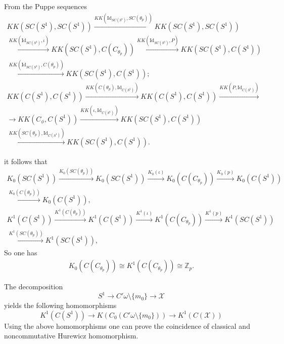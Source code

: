 \documentclass{beamer}
\theoremstyle{plain}
\newcommand{\Z}{\mathbb{Z}}                  %
\newcommand{\om}{\omega}                     %
\newcommand{\Id}{\mathrm{Id}}
\newcommand{\sX}{\mathcal{X}}       %
\renewcommand{\th}{\theta}
\newcommand{\bean}{\begin{eqnarray*}}
\newcommand{\eean}{\end{eqnarray*}}
\begin{document}
	\begin{frame}
		From the Puppe sequences 
		\small
\bean
KK\left(SC\left(S^1 \right), SC\left(S^1 \right)  \right)\xrightarrow{KK\left( \Id_{SC\left(S^1 \right)},SC\left(\th_p \right)  \right)} KK\left(SC\left(S^1 \right), SC\left(S^1 \right)  \right)\\\xrightarrow{KK\left( \Id_{SC\left(S^1 \right)},\iota  \right)} KK\left(SC\left(S^1 \right),C\left(C_{\th_p} \right) \right)\xrightarrow{KK\left( \Id_{SC\left(S^1 \right)},P \right)} KK\left(SC\left(S^1 \right), C\left(S^1 \right)  \right) \\ \xrightarrow{KK\left( \Id_{SC\left(S^1 \right)},C\left(\th_p \right)  \right)} KK\left(SC\left(S^1 \right), C\left(S^1 \right)  \right);\\
KK\left(C\left(S^1 \right),C\left(S^1 \right)   \right)\xrightarrow{KK\left(C\left(\th_p \right),\Id_{C\left(S^1 \right) }   \right)} KK\left(C\left(S^1 \right),C\left(S^1 \right)   \right) \xrightarrow{KK\left(P,\Id_{C\left(S^1 \right) }   \right)}\\\to KK\left(C_\phi,C\left(S^1 \right)   \right) \xrightarrow{KK\left(\iota,\Id_{C\left(S^1 \right) }   \right)} KK\left(SC\left(S^1 \right), C\left(S^1 \right) \right)\\\xrightarrow{KK\left(SC\left(\th_p \right),\Id_{C\left(S^1 \right) }   \right)}KK\left(SC\left(S^1 \right),C\left(S^1 \right)  \right).
\eean		\end{frame}
\begin{frame}
\normalsize it follows that	\small
\bean
K_0\left( SC\left(S^1 \right)  \right)\xrightarrow{K_0\left( SC\left(\th_p \right)  \right)} 	K_0\left( SC\left(S^1 \right) \right) \xrightarrow{K_0\left( \iota \right) }  K_0\left(C\left(C_{\th_p} \right) \right)\xrightarrow{K_0\left( p \right)}  	K_0\left( C\left(S^1 \right)  \right) \\ \xrightarrow{K_0\left( C\left(\th_p \right)  \right)} 	K_0\left( C\left(S^1 \right) \right),\\
K^1\left( C\left(S^1 \right)  \right)\xrightarrow{K^1\left( C\left(\th_p \right)  \right)} 	K^1\left( C\left(S^1 \right) \right) \xrightarrow{K^1\left( \iota \right) }  K^1\left(C\left(C_{\th_p} \right) \right)\xrightarrow{K^1\left( p \right)}  	K^1\left( SC\left(S^1 \right)  \right) \\ \xrightarrow{K^1\left( SC\left(\th_p \right)  \right)} 	K^1\left( SC\left(S^1 \right) \right),
\eean
\normalsize So one has
\bean
K_0\left(C\left(C_{\th_p} \right) \right) \cong K^1\left(C\left(C_{\th_p} \right)\right)  \cong \Z_p.
\eean 
\end{frame}


\begin{frame}
\normalsize
The decomposition 
$$
S^1   \to C'\om\setminus \{m_0\} \to \sX
$$
yields the following homomorphisms
$$
K^1\left(C\left(S^1 \right)  \right) \to K\left(C_0\left( C'\om\setminus \{m_0\} \right)  \right) \to K^1\left(C\left(\sX \right)  \right) 
$$
Using the above homomorphisms one can prove the coincidence of classical and noncommutative Hurewicz homomorphism.

\end{frame}
\end{document}
